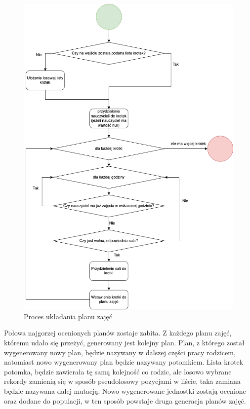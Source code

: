    \begin{figure}[H]
\centering\includegraphics[width=\textwidth]{figures/time_table_prep}
\caption{Proces układania planu zajęć}\label{rys:time_table_prep}
\end{figure}

Połowa najgorzej ocenionych planów zostaje zabita. Z każdego planu zajęć, któremu udało się przeżyć, generowany jest kolejny plan. Plan, z którego został wygenerowany nowy plan, będzie nazywany w dalszej części pracy rodzicem, natomiast nowo wygenerowany plan będzie nazywany potomkiem. Lista krotek potomka, będzie zawierała tę samą kolejność co rodzic, ale losowo wybrane rekordy zamienią się w sposób pseudolosowy pozycjami w liście, taka zamiana będzie nazywana dalej mutacją. Nowo wygenerowane jednostki zostają ocenione oraz dodane do populacji, w ten sposób powstaje druga generacja planów zajęć.

